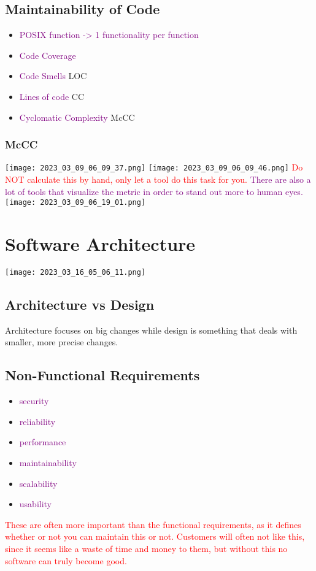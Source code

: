 \documentclass[main.tex,fontsize=8pt,paper=a4,paper=portrait,DIV=calc,]{scrartcl}
\begin{document}
\subsection{Maintainability of Code}
\begin{itemize}
\item \textcolor{purple}{POSIX function -> 1 functionality  per function}
\item \textcolor{purple}{Code Coverage}
\item \textcolor{purple}{Code Smells} LOC
\item \textcolor{purple}{Lines of code} CC
\item \textcolor{purple}{Cyclomatic Complexity} McCC
\end{itemize} 

\subsubsection{McCC}
\texttt{[image: 2023\_03\_09\_06\_09\_37.png]}
\texttt{[image: 2023\_03\_09\_06\_09\_46.png]}\newline
\textcolor{red}{Do NOT calculate this by hand, only let a tool do this task for you.}\newline
\textcolor{purple}{There are also a lot of tools that visualize the metric in order to stand out more to human eyes.}\newline
\texttt{[image: 2023\_03\_09\_06\_19\_01.png]}

\section{Software Architecture}
\texttt{[image: 2023\_03\_16\_05\_06\_11.png]}

\subsection{Architecture vs Design}
Architecture focuses on big changes while design is something that deals with smaller, more precise changes.

\subsection{Non-Functional Requirements}
\begin{itemize}
\item \textcolor{purple}{security}
\item \textcolor{purple}{reliability}
\item \textcolor{purple}{performance}
\item \textcolor{purple}{maintainability}
\item \textcolor{purple}{scalability}
\item \textcolor{purple}{usability}
\end{itemize} 
\textcolor{red}{These are often more important than the functional requirements, as it defines whether or not you can maintain this or not.\newline
Customers will often not like this, since it seems like a waste of time and money to them, but without this no software can truly become good.}
\end{document}
